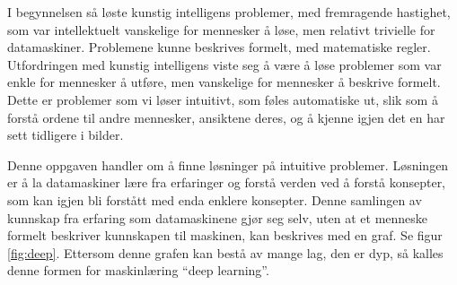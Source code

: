 I begynnelsen så løste kunstig intelligens problemer, med fremragende hastighet, som var intellektuelt vanskelige for mennesker å løse, men relativt trivielle for datamaskiner. Problemene kunne beskrives formelt, med matematiske regler. Utfordringen med kunstig intelligens viste seg å være å løse problemer som var enkle for mennesker å utføre, men vanskelige for mennesker å beskrive formelt. Dette er problemer som vi løser intuitivt, som føles automatiske ut, slik som å forstå ordene til andre mennesker, ansiktene deres, og å kjenne igjen det en har sett tidligere i bilder. \cite{Goodfellow m.fl. 2016 s. 1}

Denne oppgaven handler om å finne løsninger på intuitive problemer. Løsningen er å la datamaskiner lære fra erfaringer og forstå verden ved å forstå konsepter, som kan igjen bli forstått med enda enklere konsepter. Denne samlingen av kunnskap fra erfaring som datamaskinene gjør seg selv, uten at et menneske formelt beskriver kunnskapen til maskinen, kan beskrives med en graf. Se figur \ref{fig:deep}. Ettersom denne grafen kan bestå av mange lag, den er dyp, så kalles denne formen for maskinlæring ``deep learning''. \cite{Goodfellow m.fl. 2016 s. 1}



